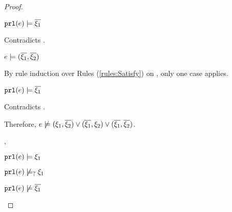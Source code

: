 \begin{proof}
\begin{byCases}
\begin{byCases}
\begin{byCases}
\begin{byCases}
\begin{byCases}
                    \begin{byCases}
                    \item[\text{(\ref{rule:CSNotValPair})}]
                        \begin{pfsteps*}
                        \item $\mathtt{prl}(e) \models \overline{\xi_1}$ 
                        \end{pfsteps*}
                        Contradicts .
                    \end{byCases}
                \item[\text{(\ref{rule:CSOr2})}]
                    \begin{pfsteps*}
                    \item $e \models (\overline{\xi_1} , \overline{\xi_2})$  
                    \end{pfsteps*}
                    By rule induction over Rules (\ref{rules:Satisfy}) on , only one case applies.
                    \begin{byCases}
                    \item[\text{(\ref{rule:CSNotValPair})}]
                        \begin{pfsteps*}
                        \item $\mathtt{prl}(e) \models \overline{\xi_1}$ 
                        \end{pfsteps*}
                        Contradicts .
                    \end{byCases}
                \end{byCases}
            \end{byCases}
            Therefore, $e \not\models (\xi_1 , \overline{\xi_2}) \vee (\overline{\xi_1} , \xi_2) \vee (\overline{\xi_1} , \overline{\xi_2})$.
        \item[\csatisfy{\hprl{e}}{\xi_1},\cmaysatisfy{\hprr{e}}{\xi_2}]
            \begin{pfsteps*}
            \item $\mathtt{prl}(e) \models \xi_1$  
            \item $\mathtt{prl}(e) \not\models_{?} \xi_1$  
            \item $\mathtt{prl}(e) \not\models \overline{\xi_1}$  

\end{pfsteps*}
\end{byCases}
\end{byCases}
\end{byCases}
\end{proof}
